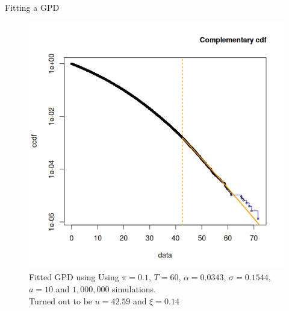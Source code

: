 \documentclass[10pt]{beamer}
\begin{document}
\begin{frame}[fragile]{Fitting a GPD}
  \begin{figure}[h]
    \centering
    \includegraphics[scale=0.4]{cppi-ccdf-autothresh.png}
    \caption{Fitted GPD using Using $\pi = 0.1$, $T=60$, $\alpha = 0.0343$, $\sigma = 0.1544$, $a=10$ and $1,000,000$ simulations. \\

    Turned out to be $u = 42.59$ and $\xi = 0.14$}
    \label{fig:cppi-ccdf-autothresh}
  \end{figure}
\end{frame}
\end{document}
